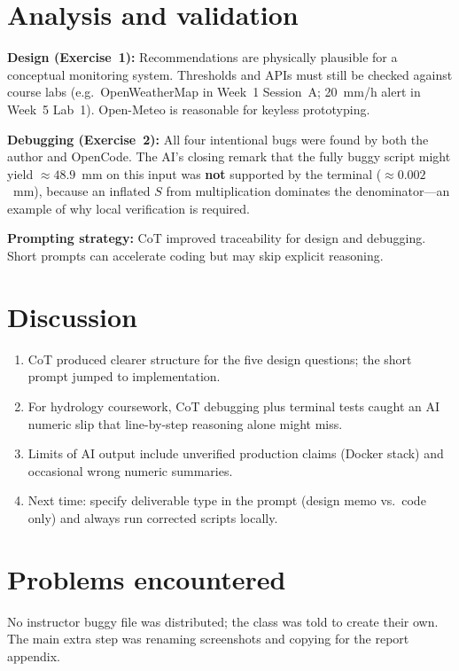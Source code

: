 \documentclass[11pt,a4paper]{article}
\begin{document}
\section{Analysis and validation}

\textbf{Design (Exercise~1):} Recommendations are physically plausible for a conceptual monitoring system. Thresholds and APIs must still be checked against course labs (e.g.\ OpenWeatherMap in Week~1 Session~A; 20~mm/h alert in Week~5 Lab~1). Open-Meteo is reasonable for keyless prototyping.

\textbf{Debugging (Exercise~2):} All four intentional bugs were found by both the author and OpenCode. The AI's closing remark that the fully buggy script might yield $\approx 48.9$~mm on this input was \textbf{not} supported by the terminal ($\approx 0.002$~mm), because an inflated $S$ from multiplication dominates the denominator---an example of why local verification is required.

\textbf{Prompting strategy:} CoT improved traceability for design and debugging. Short prompts can accelerate coding but may skip explicit reasoning.

\section{Discussion}
\begin{enumerate}[noitemsep]
  \item CoT produced clearer structure for the five design questions; the short prompt jumped to implementation.
  \item For hydrology coursework, CoT debugging plus terminal tests caught an AI numeric slip that line-by-step reasoning alone might miss.
  \item Limits of AI output include unverified production claims (Docker stack) and occasional wrong numeric summaries.
  \item Next time: specify deliverable type in the prompt (design memo vs.\ code only) and always run corrected scripts locally.
\end{enumerate}

\section{Problems encountered}
No instructor buggy file was distributed; the class was told to create their own. The main extra step was renaming screenshots and copying  for the report appendix.
\end{document}
